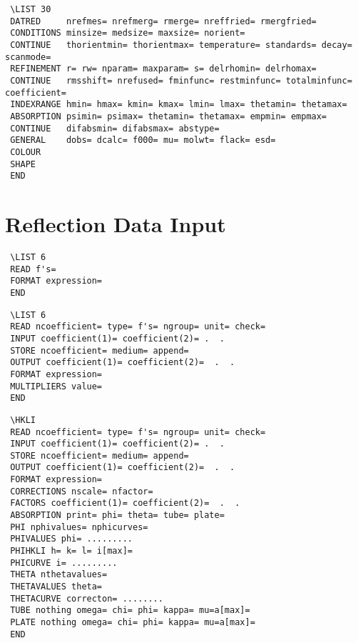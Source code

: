 \documentclass[10pt,a4paper]{report}
\begin{document}
\bigskip{}



\small\begin{verbatim}
 \LIST 30
 DATRED     nrefmes= nrefmerg= rmerge= nreffried= rmergfried=
 CONDITIONS minsize= medsize= maxsize= norient=
 CONTINUE   thorientmin= thorientmax= temperature= standards= decay= scanmode=
 REFINEMENT r= rw= nparam= maxparam= s= delrhomin= delrhomax=
 CONTINUE   rmsshift= nrefused= fminfunc= restminfunc= totalminfunc= coefficient=
 INDEXRANGE hmin= hmax= kmin= kmax= lmin= lmax= thetamin= thetamax=
 ABSORPTION psimin= psimax= thetamin= thetamax= empmin= empmax=
 CONTINUE   difabsmin= difabsmax= abstype=
 GENERAL    dobs= dcalc= f000= mu= molwt= flack= esd=
 COLOUR
 SHAPE
 END
\end{verbatim}\normalsize


\section{Reflection Data Input}


\bigskip{}



\small\begin{verbatim}
 \LIST 6
 READ f's=
 FORMAT expression=
 END
\end{verbatim}\normalsize




\bigskip{}



\small\begin{verbatim}
 \LIST 6
 READ ncoefficient= type= f's= ngroup= unit= check=
 INPUT coefficient(1)= coefficient(2)= .  .
 STORE ncoefficient= medium= append=
 OUTPUT coefficient(1)= coefficient(2)=  .  .
 FORMAT expression=
 MULTIPLIERS value=
 END
\end{verbatim}\normalsize




\bigskip{}



\small\begin{verbatim}
 \HKLI
 READ ncoefficient= type= f's= ngroup= unit= check=
 INPUT coefficient(1)= coefficient(2)= .  .
 STORE ncoefficient= medium= append=
 OUTPUT coefficient(1)= coefficient(2)=  .  .
 FORMAT expression=
 CORRECTIONS nscale= nfactor=
 FACTORS coefficient(1)= coefficient(2)=  .  .
 ABSORPTION print= phi= theta= tube= plate=
 PHI nphivalues= nphicurves=
 PHIVALUES phi= .........
 PHIHKLI h= k= l= i[max]=
 PHICURVE i= .........
 THETA nthetavalues=
 THETAVALUES theta=
 THETACURVE correcton= ........
 TUBE nothing omega= chi= phi= kappa= mu=a[max]=
 PLATE nothing omega= chi= phi= kappa= mu=a[max]=
 END
\end{verbatim}\normalsize
\end{document}
